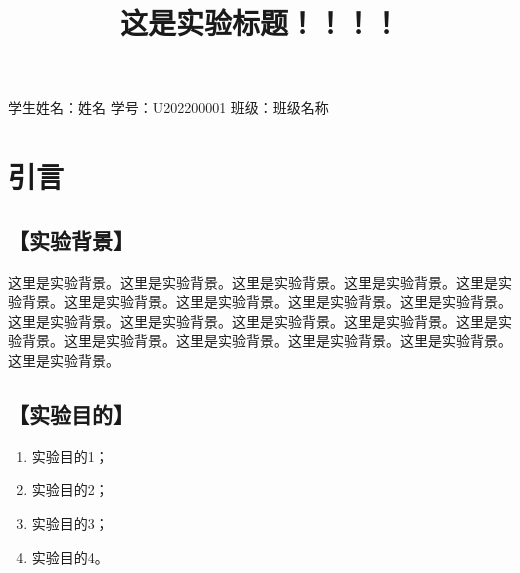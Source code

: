 \documentclass[a4paper,c5size,twoside,UTF8]{ctexart} %
\begin{document}


\renewcommand\thesubsection{}  %


\title{这是实验标题！！！！\vspace{-2em}}
\date{}
\maketitle
\thispagestyle{empty}

\centerline{学生姓名：姓名 \hfill 学号：U202200001 \hfill 班级：班级名称}

\section{引言}

\subsection{【实验背景】}
这里是实验背景。这里是实验背景。这里是实验背景。这里是实验背景。这里是实验背景。这里是实验背景。这里是实验背景。这里是实验背景。这里是实验背景。这里是实验背景。这里是实验背景。这里是实验背景。这里是实验背景。这里是实验背景。这里是实验背景。这里是实验背景。这里是实验背景。这里是实验背景。这里是实验背景。

\subsection{【实验目的】}
\begin{enumerate}[itemsep=0pt,parsep=0pt]
	\item 实验目的1；
	\item 实验目的2；
	\item 实验目的3；
	\item 实验目的4。
\end{enumerate}
\end{document}
